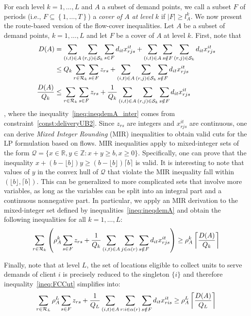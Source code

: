For each level $k=1,\ldots,L$ and $A$ a subset of demand points, we call a subset $F$ of periods (i.e., $F\subseteq \left\{1,\ldots,T\right\}$) a {\em cover of $A$ at level $k$} if $|F|\geq l^k_A$.
We now present the route-based version of the flow-cover inequalities. 
Let $A$ be a subset of demand points, $k=1,\ldots, L$ and let $F$ be a cover of $A$ at level $k$. First, note that 
\begin{align}
    D(A) &= \sum_{(i,t)\in A} \sum_{(r,j)\in\mathcal{S}_k} \sum_{s\in F} d_{it}x^{it}_{rjs}+  \sum_{(i,t)\in A}\sum_{s\notin F}\sum_{(r,j)\in\mathcal{S}_k} d_{it}x^{it}_{rjs}\nonumber\\
         &\leq Q_k \sum_{r\in\mathcal{R}_k}\sum_{s\in F} z_{rs}+  \sum_{(i,t)\in A}\sum_{(r,j)\in\mathcal{S}_k}\sum_{s\notin F} d_{it}x^{it}_{rjs}\label{ineq:ineqdemA_inter}\\
    \frac{D(A)}{Q_k}&\leq \sum_{r\in\mathcal{R}_k}\sum_{s\in F} z_{rs}+  \frac{1}{Q_k} \sum_{(i,t)\in A}\sum_{(r,j)\in\mathcal{S}_k}\sum_{s\notin F} d_{it}x^{it}_{rjs}\label{ineq:ineqdemA}
\end{align}
, where the inequality~\eqref{ineq:ineqdemA_inter} comes from constraint~\eqref{const:deliveryUB2}. 
Since $z_{rs}$ are integers and $x^{it}_{rjs}$ are continuous, one can derive {\em Mixed Integer Rounding} (MIR) inequalities to obtain valid cuts for the LP formulation based on flows.
MIR inequalities apply to mixed-integer sets of the form $\mathcal{Q} = \{x\in\mathbb{R}, y\in\mathbb{Z} : x+y\geq b, x\geq 0\}$. 
Specifically, one can prove that the inequality $x+(b-\lfloor b\rfloor) y \geq (b-\lfloor b \rfloor)\lceil b\rceil$ is valid. 
It is interesting to note that values of $y$ in the convex hull of $\mathcal{Q}$ that violate the MIR inequality fall within $(\lfloor b\rfloor, \lceil b \rceil)$.
This can be generalized to more complicated sets that involve more variables, as long as the variables can be split into an integral part and a continuous nonnegative part. 
In particular, we apply an MIR derivation to the mixed-integer set defined by inequalities~\eqref{ineq:ineqdemA} and obtain the following inequalities for all $k=1,\ldots,L$:
\begin{equation}
    \sum_{r\in\mathcal{R}_k} \left(\rho^k_A  \sum_{s\in F} z_{rs}+  \frac{1}{Q_k} \sum_{(i,t)\in A}\sum_{j\in\alpha(r)}\sum_{s\notin F} d_{it}x^{it}_{rjs}\right)\geq \rho^k_A \left\lceil\frac{D(A)}{Q_k}\right\rceil   \label{ineq:FCCut}
\end{equation}

Finally, note that at level $L$, the set of locations eligible to collect units to serve demands of client $i$ is precisely reduced to the singleton $\{i\}$ and therefore inequality~\eqref{ineq:FCCut} simplifies into:
\begin{equation}
   \sum_{r\in\mathcal{R}_L} \rho^L_A  \sum_{s\in F} z_{rs}+  \frac{1}{Q_L} \sum_{(i,t)\in A}\sum_{r:i\in\alpha(r)}\sum_{s\notin F} d_{it}x^{it}_{ris}\geq \rho^L_A \left\lceil\frac{D(A)}{Q_L}\right\rceil   \label{ineq:FCCutClient}
\end{equation}
